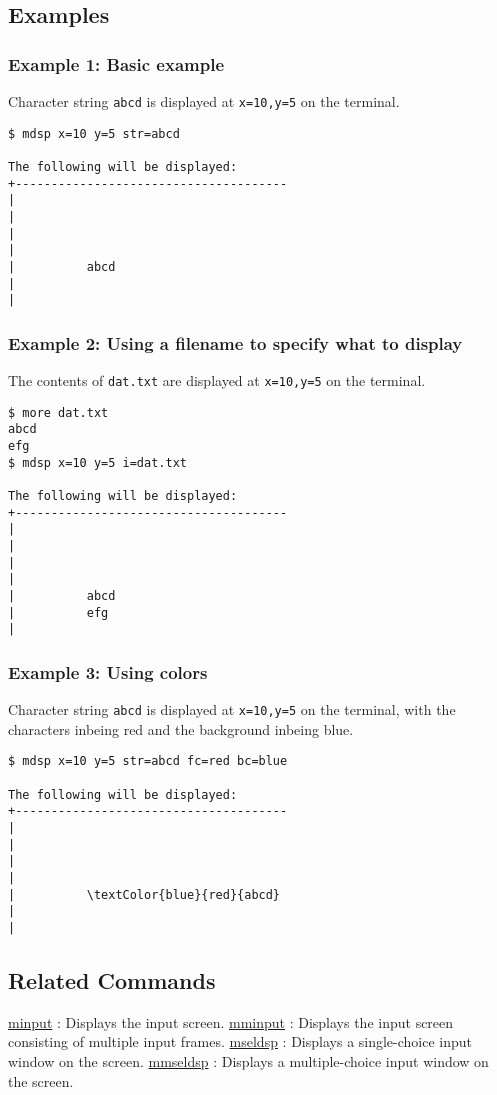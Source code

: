 \subsection*{Examples}

\subsubsection*{Example 1:  Basic example}
Character string \verb|abcd| is displayed at \verb|x=10,y=5| on the terminal.

\begin{Verbatim}[baselinestretch=0.7,frame=single]
$ mdsp x=10 y=5 str=abcd

The following will be displayed:
+--------------------------------------
|
|
|
|
|          abcd
|
|
\end{Verbatim}

\subsubsection*{Example 2: Using a filename to specify what to display}
The contents of \verb|dat.txt| are displayed at \verb|x=10,y=5| on the terminal.

\begin{Verbatim}[baselinestretch=0.7,frame=single]
$ more dat.txt
abcd
efg
$ mdsp x=10 y=5 i=dat.txt

The following will be displayed:
+--------------------------------------
|
|
|
|
|          abcd
|          efg
|
\end{Verbatim}

\subsubsection*{Example 3: Using colors}
Character string \verb|abcd| is displayed at \verb|x=10,y=5| on the terminal, with the characters inbeing red and the background inbeing blue.

\begin{Verbatim}[baselinestretch=0.7,frame=single]
$ mdsp x=10 y=5 str=abcd fc=red bc=blue

The following will be displayed:
+--------------------------------------
|
|
|
|
|          \textColor{blue}{red}{abcd}
|
|
\end{Verbatim}

\subsection*{Related Commands}
\hyperref[sect:minput] {minput} : Displays the input screen.
\hyperref[sect:mminput] {mminput} : Displays the input screen consisting of multiple input frames.
\hyperref[sect:mseldsp] {mseldsp} : Displays a single-choice input window on the screen.
\hyperref[sect:mmseldsp] {mmseldsp} : Displays a multiple-choice input window on the screen.

%


